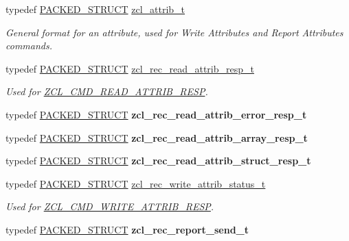 \begin{DoxyCompactItemize}
typedef \hyperlink{group___s_x_a_ga4233297bd31be5c273d4fb0758cc54d7}{P\-A\-C\-K\-E\-D\-\_\-\-S\-T\-R\-U\-C\-T} \hyperlink{group__zcl_ga2373217b6694c1cb1a99113c24519a73}{zcl\-\_\-attrib\-\_\-t}
\begin{DoxyCompactList}\small\item\em General format for an attribute, used for Write Attributes and Report Attributes commands. \end{DoxyCompactList}\item 
typedef \hyperlink{group___s_x_a_ga4233297bd31be5c273d4fb0758cc54d7}{P\-A\-C\-K\-E\-D\-\_\-\-S\-T\-R\-U\-C\-T} \hyperlink{group__zcl_ga4d098e33e67cdba2f8a968ff66471cfb}{zcl\-\_\-rec\-\_\-read\-\_\-attrib\-\_\-resp\-\_\-t}
\begin{DoxyCompactList}\small\item\em Used for \hyperlink{group__zcl_ga85ca2068c5dc26db307b60b0ac54bc9c}{Z\-C\-L\-\_\-\-C\-M\-D\-\_\-\-R\-E\-A\-D\-\_\-\-A\-T\-T\-R\-I\-B\-\_\-\-R\-E\-S\-P}. \end{DoxyCompactList}\item 
typedef \hyperlink{group___s_x_a_ga4233297bd31be5c273d4fb0758cc54d7}{P\-A\-C\-K\-E\-D\-\_\-\-S\-T\-R\-U\-C\-T} {\bfseries zcl\-\_\-rec\-\_\-read\-\_\-attrib\-\_\-error\-\_\-resp\-\_\-t}
\item 
typedef \hyperlink{group___s_x_a_ga4233297bd31be5c273d4fb0758cc54d7}{P\-A\-C\-K\-E\-D\-\_\-\-S\-T\-R\-U\-C\-T} {\bfseries zcl\-\_\-rec\-\_\-read\-\_\-attrib\-\_\-array\-\_\-resp\-\_\-t}
\item 
typedef \hyperlink{group___s_x_a_ga4233297bd31be5c273d4fb0758cc54d7}{P\-A\-C\-K\-E\-D\-\_\-\-S\-T\-R\-U\-C\-T} {\bfseries zcl\-\_\-rec\-\_\-read\-\_\-attrib\-\_\-struct\-\_\-resp\-\_\-t}
\item 
typedef \hyperlink{group___s_x_a_ga4233297bd31be5c273d4fb0758cc54d7}{P\-A\-C\-K\-E\-D\-\_\-\-S\-T\-R\-U\-C\-T} \hyperlink{group__zcl_ga22e48ce5d4bb199b52f155f53e396f87}{zcl\-\_\-rec\-\_\-write\-\_\-attrib\-\_\-status\-\_\-t}
\begin{DoxyCompactList}\small\item\em Used for \hyperlink{group__zcl_ga0595c0f6957be4e80265ecd36158c0ae}{Z\-C\-L\-\_\-\-C\-M\-D\-\_\-\-W\-R\-I\-T\-E\-\_\-\-A\-T\-T\-R\-I\-B\-\_\-\-R\-E\-S\-P}. \end{DoxyCompactList}\item 
typedef \hyperlink{group___s_x_a_ga4233297bd31be5c273d4fb0758cc54d7}{P\-A\-C\-K\-E\-D\-\_\-\-S\-T\-R\-U\-C\-T} {\bfseries zcl\-\_\-rec\-\_\-report\-\_\-send\-\_\-t}
\item 

\end{DoxyCompactItemize}
